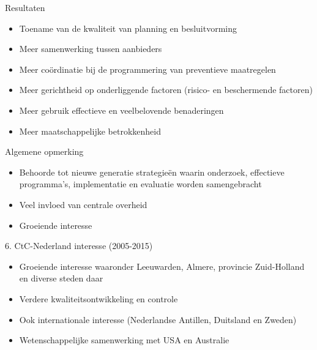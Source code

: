 \documentclass[
  ignorenonframetext,
]{beamer}
\providecommand{\tightlist}{%
  \setlength{\itemsep}{0pt}\setlength{\parskip}{0pt}}\usepackage{longtable,booktabs,array}
\begin{document}
\begin{frame}{Resultaten}
\protect\hypertarget{resultaten}{}
\begin{itemize}
\tightlist
\item
  Toename van de kwaliteit van planning en besluitvorming\\
\item
  Meer samenwerking tussen aanbieders\\
\item
  Meer coördinatie bij de programmering van preventieve maatregelen\\
\item
  Meer gerichtheid op onderliggende factoren (risico- en beschermende
  factoren)\\
\item
  Meer gebruik effectieve en veelbelovende benaderingen\\
\item
  Meer maatschappelijke betrokkenheid
\end{itemize}
\end{frame}

\begin{frame}{Algemene opmerking}
\protect\hypertarget{algemene-opmerking}{}
\begin{itemize}
\tightlist
\item
  Behoorde tot nieuwe generatie strategieën waarin onderzoek, effectieve
  programma's, implementatie en evaluatie worden samengebracht\\
\item
  Veel invloed van centrale overheid\\
\item
  Groeiende interesse
\end{itemize}
\end{frame}

\begin{frame}{6. CtC-Nederland interesse (2005-2015)}
\protect\hypertarget{ctc-nederland-interesse-2005-2015}{}
\begin{itemize}
\tightlist
\item
  Groeiende interesse waaronder Leeuwarden, Almere, provincie
  Zuid-Holland en diverse steden daar\\
\item
  Verdere kwaliteitsontwikkeling en controle
\item
  Ook internationale interesse (Nederlandse Antillen, Duitsland en
  Zweden)\\
\item
  Wetenschappelijke samenwerking met USA en Australie
\end{itemize}
\end{frame}
\end{document}

